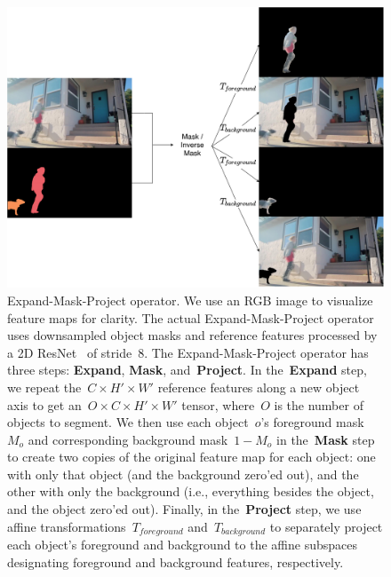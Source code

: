 \begin{figure}
\centering
\includegraphics[scale=0.18]{Figures/expand-mask-project}
\caption{Expand-Mask-Project operator.
         We use an RGB image to visualize feature maps for clarity.
         The actual Expand-Mask-Project operator uses downsampled object masks
         and reference features processed by a 2D ResNet~\cite{he2016deep} of
         stride~\num{8}.
         The Expand-Mask-Project operator has three steps: \textbf{Expand},
         \textbf{Mask}, and~\textbf{Project}.
         In the~\textbf{Expand} step, we repeat the~$C\times H'\times W'$
         reference features along a new object axis to get
         an~$O\times C\times H'\times W'$ tensor, where~$O$ is the number of
         objects to segment.
         We then use each object~$o$'s foreground mask~$M_o$ and corresponding
         background mask~$1 - M_o$ in the~\textbf{Mask} step to create two
         copies of the original feature map for each object: one with only that
         object (and the background zero'ed out), and the other with only the
         background (i.e., everything besides the object, and the object
         zero'ed out).
         Finally, in the~\textbf{Project} step, we use affine
         transformations~$T_{foreground}$ and~$T_{background}$ to separately
         project each object's foreground and background to the affine
         subspaces designating foreground and background features,
         respectively.}
\label{fig:expandmaskproject}
\end{figure}

